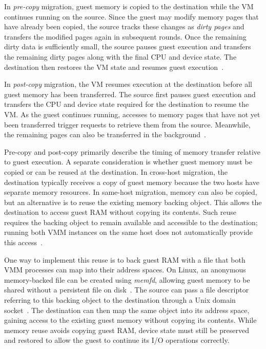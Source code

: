 In \emph{pre-copy} migration, guest memory is copied to the destination 
while the VM continues running on the source. Since the guest may modify 
memory pages that have already been copied, the source tracks these changes 
as \emph{dirty pages} and transfers the modified pages again in subsequent 
rounds. Once the remaining dirty data is sufficiently small, the source 
pauses guest execution and transfers the remaining dirty pages along with 
the final CPU and device state. The destination then restores the VM state 
and resumes guest execution~\cite{clark2005migration}.

In \emph{post-copy} migration, the VM resumes execution at the destination 
before all guest memory has been transferred. The source first pauses guest 
execution and transfers the CPU and device state required for the destination 
to resume the VM. As the guest continues running, accesses to memory pages 
that have not yet been transferred trigger requests to retrieve them from the 
source. Meanwhile, the remaining pages can also be transferred in the 
background~\cite{hines2009postcopy}.

Pre-copy and post-copy primarily describe the timing of memory transfer 
relative to guest execution. A separate consideration is whether guest 
memory must be copied or can be reused at the destination. In cross-host 
migration, the destination typically receives a copy of guest memory because 
the two hosts have separate memory resources. In same-host migration, memory 
can also be copied, but an alternative is to reuse the existing memory 
backing object. This allows the destination to access guest RAM without 
copying its contents. Such reuse requires the backing object to remain 
available and accessible to the destination; running both VMM instances on 
the same host does not automatically provide this access~\cite{clark2005migration,qemu-cpr}.

One way to implement this reuse is to back guest RAM with a file that both 
VMM processes can map into their address spaces. On Linux, an anonymous 
memory-backed file can be created using \emph{memfd}, allowing guest memory 
to be shared without a persistent file on disk~\cite{linux-memfd}. The source 
can pass a file descriptor referring to this backing object to the destination 
through a Unix domain socket~\cite{linux-unix}. The destination can then map 
the same object into its address space, gaining access to the existing guest 
memory without copying its contents. While memory reuse avoids copying guest 
RAM, device state must still be preserved and restored to allow the guest to 
continue its I/O operations correctly.

